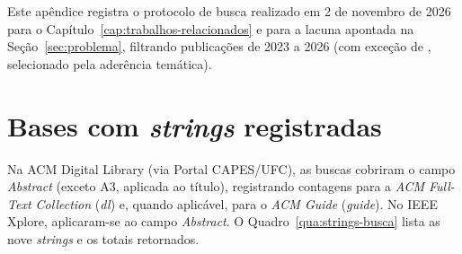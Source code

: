 \label{ap:busca}

Este apêndice registra o protocolo de busca realizado em 2 de novembro de 2026
para o Capítulo~\ref{cap:trabalhos-relacionados} e para a lacuna apontada na
Seção~\ref{sec:problema}, filtrando publicações de 2023 a 2026 (com exceção de
, selecionado pela aderência temática).

\section*{Bases com \textit{strings} registradas}

Na ACM Digital Library (via Portal CAPES/UFC), as buscas cobriram o campo
\textit{Abstract} (exceto A3, aplicada ao título), registrando contagens para a
\textit{ACM Full-Text Collection} (\textit{dl}) e, quando aplicável, para o
\textit{ACM Guide} (\textit{guide}). No IEEE Xplore, aplicaram-se ao campo
\textit{Abstract}. O Quadro~\ref{qua:strings-busca} lista as nove
\textit{strings} e os totais retornados.

